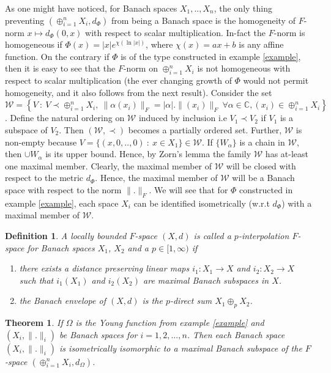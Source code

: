 \documentclass[pdflatex,sn-mathphys-num]{sn-jnl}%
\newtheorem{definition}{Definition}
\theoremstyle{thmstyleone}%
\newtheorem{theorem}{Theorem}%
\theoremstyle{thmstyletwo}%
\theoremstyle{thmstylethree}%
\begin{document}
	As one might have noticed, for Banach spaces $X_1,..,X_n$, the only thing preventing $\left(\oplus_{i=1}^nX_i,d_\Phi\right)$ from being a Banach space is the homogeneity of $F$-norm $x\mapsto d_\Phi(0,x)$ with respect to scalar multiplication. In-fact the $F$-norm is homogeneous if $\Phi(x)=|x|e^{\chi(\ln |x|)}$, where $\chi(x)=ax+b$ is any affine function. On the contrary if $\Phi$ is of the type constructed in example \ref{example}, then it is easy to see that the $F$-norm on $\oplus_{i=1}^nX_i$ is not homogeneous with respect to scalar multiplication (the ever changing growth of $\Phi$ would not permit homogeneity, and it also follows from the next result).	Consider the set $\mathcal W=\left\{V~:~V\prec \oplus_{i=1}^nX_i,~ \|\alpha(x_i)\|_F=|\alpha|.\|(x_i)\|_F~\forall \alpha\in \mathbb C, (x_i)\in \oplus_{i=1}^nX_i  \right\}$. Define the natural ordering on $\mathcal W$ induced by inclusion i.e $V_1\prec V_2$ if $V_1$ is a subspace of $V_2$. Then $\left(\mathcal W, \prec\right)$ becomes a partially ordered set. Further, $\mathcal W$ is non-empty because $V=\{(x,0,..,0)~:~ x\in X_1\}\in \mathcal W$. If $\{W_\alpha\}$ is a  chain in $\mathcal W$, then $\cup W_\alpha$ is its upper bound. Hence, by Zorn's lemma the family $\mathcal W$ has at-least one maximal member. Clearly, the maximal member of $\mathcal W$  will be closed with respect to the metric $d_\Phi$. Hence, the maximal member of $\mathcal W$ will be a Banach space with respect to the norm $\|.\|_F$. We will see that for $\Phi$ constructed in example \ref{example}, each space $X_i$ can be identified isometrically (w.r.t $d_\Phi$) with a maximal member of $\mathcal W$.
	\begin{definition}
		A locally bounded $F$-space $(X,d)$ is called a $p$-interpolation $F$-space for Banach spaces $X_1$, $X_2$ and a $p\in [1,\infty)$ if
		\begin{enumerate} 
			\item there exists a distance preserving linear maps $i_1:X_1\to X$ and $i_2:X_2\to X$ such that $i_1(X_1)$ and $i_2(X_2)$ are maximal Banach subspaces in $X$.
			\item the Banach envelope of $(X,d)$ is the $p$-direct sum  $X_1\oplus_p X_2$.
		\end{enumerate}
	\end{definition}
	\begin{theorem}
		If $\Omega$ is the Young function from example \ref{example} and $(X_i,\|.\|_i)$ be Banach spaces for $i=1,2,...,n$. Then each Banach space  $\left(X_i,\|.\|_i\right)$ is isometrically isomorphic to a maximal Banach subspace of the $F$-space $\left(\oplus_{i=1}^nX_i,d_\Omega\right)$.
	\end{theorem}
\end{document}
